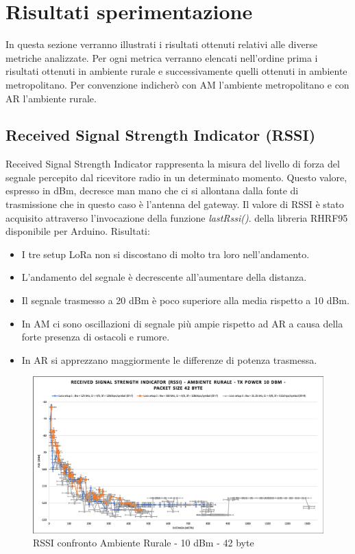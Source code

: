 \documentclass[12pt,a4paper,openright,twoside]{report}
\begin{document}
\section{Risultati sperimentazione}
In questa sezione verranno illustrati i risultati ottenuti relativi alle diverse metriche analizzate.
Per ogni metrica verranno elencati nell'ordine prima i risultati ottenuti in ambiente rurale e successivamente quelli ottenuti in ambiente metropolitano.
Per convenzione indicher\`o con AM l'ambiente metropolitano e con AR l'ambiente rurale.

\subsection{Received Signal Strength Indicator (RSSI)}
Received Signal Strength Indicator rappresenta la misura del livello di forza del segnale percepito dal ricevitore radio in un determinato momento. Questo valore, espresso in dBm, decresce man mano che ci si allontana dalla fonte di trasmissione che in questo caso \`e l'antenna del gateway. 
Il valore di RSSI \`e stato acquisito attraverso l'invocazione della funzione \textit{lastRssi()}.
della libreria RHRF95 disponibile per Arduino.
Risultati:
\begin{itemize}    
\item I tre setup LoRa non si discostano di molto tra loro nell'andamento.  
\item L'andamento del segnale \`e decrescente all'aumentare della distanza.
\item Il segnale trasmesso a 20 dBm \`e poco superiore alla media rispetto a 10 dBm. 
\item In AM ci sono oscillazioni di segnale pi\`u ampie rispetto ad AR a causa della forte presenza di ostacoli e rumore.
\item In AR si apprezzano maggiormente le differenze di potenza trasmessa. 
\end{itemize}


\begin{figure}[h]                      
\begin{center} 
\includegraphics[width=\textwidth]{RSSI_confronto_AR-10dBm-42byte.png}
\caption[RSSI confronto Ambiente Rurale - 10 dBm - 42 byte]{RSSI confronto Ambiente Rurale - 10 dBm - 42 byte}\label{fig:prima}
\end{center}
\end{figure}
\end{document}
